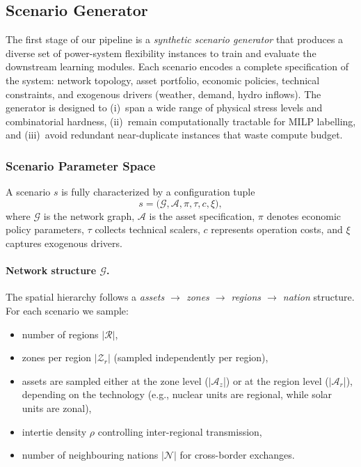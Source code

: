 \documentclass{article}
\begin{document}

\subsection{Scenario Generator}
\label{sec:scenario_generator}

The first stage of our pipeline is a \emph{synthetic scenario generator} that produces a diverse set of power-system flexibility instances to train and evaluate the downstream learning modules. Each scenario encodes a complete specification of the system: network topology, asset portfolio, economic policies, technical constraints, and exogenous drivers (weather, demand, hydro inflows). The generator is designed to (i)~span a wide range of physical stress levels and combinatorial hardness, (ii)~remain computationally tractable for MILP labelling, and (iii)~avoid redundant near-duplicate instances that waste compute budget.

\subsubsection{Scenario Parameter Space}
\label{sec:scenario_space}

A scenario $s$ is fully characterized by a configuration tuple
\begin{equation}
s = \bigl(\mathcal{G}, \mathcal{A}, \pi, \tau, c, \xi\bigr),
\end{equation}
where $\mathcal{G}$ is the network graph, $\mathcal{A}$ is the asset specification, $\pi$ denotes economic policy parameters, $\tau$ collects technical scalers, $c$ represents operation costs, and $\xi$ captures exogenous drivers.

\paragraph{Network structure $\mathcal{G}$.}
The spatial hierarchy follows a \emph{assets $\rightarrow$ zones $\rightarrow$ regions $\rightarrow$ nation} structure. For each scenario we sample:
\begin{itemize}[noitemsep]
  \item number of regions $|\mathcal{R}|$,
  \item zones per region $|\mathcal{Z}_r|$ (sampled independently per region),
  \item assets are sampled either at the zone level ($|\mathcal{A}_z$|) or at the region level ($|\mathcal{A}_r$|), depending on the technology (e.g., nuclear units are regional, while solar units are zonal),
  \item intertie density $\rho$ controlling inter-regional transmission,
  \item number of neighbouring nations $|\mathcal{N}|$ for cross-border exchanges.
\end{itemize}
\end{document}
